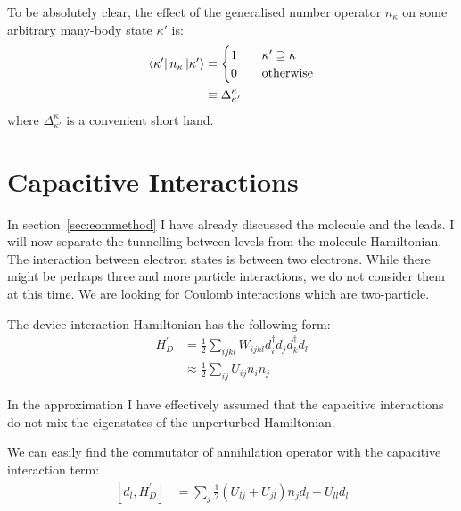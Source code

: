 To be absolutely clear, the effect of the generalised number operator $n_\kappa$ on some arbitrary many-body state $\kappa'$ is:
\begin{align}
\bra{\kappa'} n_\kappa \ket{\kappa'} &= \begin{cases} 1 &\quad \kappa'\supseteq\kappa \\
0 & \quad \text{otherwise} \end{cases}
\label{eq:generalisednumberoperator}\\
&\equiv \Delta^{\kappa}_{\kappa'}\nonumber
\end{align}
where $\Delta^{\kappa}_{\kappa'}$ is a convenient short hand.

\section{Capacitive Interactions} 
\label{sec:capacitive}
In section~\ref{sec:eommethod} I have already discussed the molecule and the leads. I will now separate the tunnelling between levels from the molecule Hamiltonian. The interaction between electron states is between two electrons. While there might be perhaps three and more particle interactions, we do not consider them at this time. We are looking for Coulomb interactions which are two-particle.

The device interaction Hamiltonian has the following form:
\begin{align*}
H^\prime_D &= \frac{1}{2} \sum_{ijkl} W_{ijkl} d^\dagger_i d_j d^\dagger_k d_l \\
&\approx \frac{1}{2} \sum_{ij} U_{ij} n_i n_j
\end{align*}

In the approximation I have effectively assumed that the capacitive interactions do not mix the eigenstates of the unperturbed Hamiltonian. 

We can easily find the commutator of annihilation operator with the capacitive interaction term:
\begin{align*}
\left[ d_l, H^\prime_D\right] &= \sum_{j} \frac{1}{2} \left( U_{lj} + U_{jl}\right) n_j d_l + U_{ll} d_l
\end{align*}

